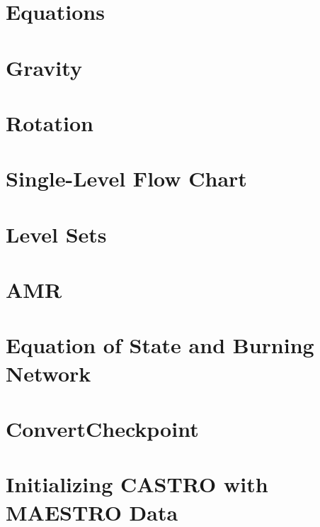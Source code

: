 \documentclass[11pt]{book}
\begin{document}
\chapter{Equations}


\chapter{Gravity}


\chapter{Rotation}


\chapter{Single-Level Flow Chart}


%

\chapter{Level Sets}\label{Chap:Level Sets}


\chapter{AMR}


\chapter{Equation of State and Burning Network}


\chapter{ConvertCheckpoint}


\chapter{Initializing CASTRO with MAESTRO Data}

\end{document}
